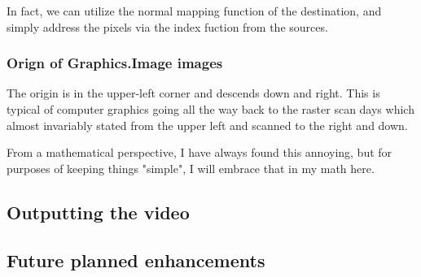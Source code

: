 \documentclass[letterpaper, 11pt]{article}
\begin{document}
In fact, we can utilize the normal mapping function of the destination, and 
simply address the pixels via the index fuction from the sources.

\subsubsection{Orign of Graphics.Image images}
\label{sec:orgdf72c00}
The origin is in the upper-left corner and descends down and right.
This is typical of computer graphics going all the way back to the raster scan
days which almost invariably stated from the upper left and scanned to the
right and down.

From a mathematical perspective, I have always found this annoying, but for
purposes of keeping things "simple", I will embrace that in my math here.

\subsection{Outputting the video}
\label{sec:org6a17048}
\subsection{Future planned enhancements}
\label{sec:org507cba6}
\end{document}
